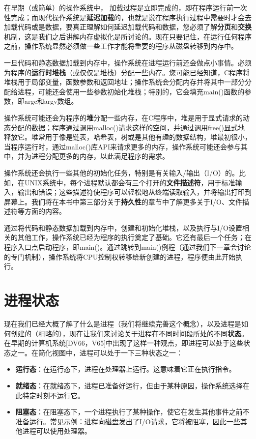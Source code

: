 在早期（或简单）的操作系统中， 加载过程是立即完成的，即在程序运行前一次性完成；而现代操作系统是\textbf{延迟加载}的，也就是说在程序执行过程中需要时才会去加载代码或是数据，要真正理解如何延迟加载代码和数据，您必须了解\textbf{分页}和\textbf{交换}机制，这是我们之后讲解内存虚拟化是所讨论的。现在只要记住，在运行任何程序之前，操作系统显然必须做一些工作才能将重要的程序从磁盘转移到内存中。

一旦代码和静态数据加载到内存中，操作系统在进程运行前还会做点小事情。必须为程序的\textbf{运行时堆栈}（或仅仅是堆栈）分配一些内存。您可能已经知道，C程序将堆栈用于局部变量，函数参数和返回地址；操作系统会分配内存并将其中一部分分配给进程，可能还会使用一些参数初始化堆栈；特别的，它会填充main()函数的参数，即argc和argv数组。

操作系统可能还会为程序的\textbf{堆}分配一些内存，在C程序中，堆是用于显式请求的动态分配的数据；程序通过调用malloc()请求这样的空间，并通过调用free()显式地释放它。堆常用于像是链表，哈希表，树或是其他有趣的数据结构，堆最初很小，当程序运行时，通过malloc()库API来请求更多的内存，操作系统可能还会参与其中，并为进程分配更多的内存，以此满足程序的需求。

操作系统还会执行一些其他的初始化任务，特别是有关输入/输出（I/O）的。比如，在UNIX系统中，每个进程默认都会有三个打开的\textbf{文件描述符}，用于标准输入，输出和错误；这些描述符使程序可以轻松地从终端读取输入，并将输出打印到屏幕上。我们将在本书中第三部分关于\textbf{持久性}的章节中了解更多关于I/O、文件描述符等方面的内容。

通过将代码和静态数据加载到内存中，创建和初始化堆栈，以及执行与I/O设置相关的其他工作，操作系统已经为程序的执行奠定了基础。它还有最后一个任务；在程序入口点启动程序，即main()。通过跳转到main()例程（通过我们下一章会讨论的专门机制），操作系统将CPU控制权转移给新创建的进程，程序便由此开始执行。

\section{进程状态}
现在我们已经大概了解了什么是进程（我们将继续完善这个概念），以及进程是如何创建的（粗略的），现在让我们来讨论关于进程在不同时间段所处的不同\textbf{状态}。在早期的计算机系统[DV66，V65]中出现了这样一种观点，即进程可以处于这些状态之一。在简化视图中，进程可以处于一下三种状态之一：
\begin{itemize}
\item \textbf{运行态}：在运行态下，进程在处理器上运行。这意味着它正在执行指令。
\item \textbf{就绪态}：在就绪态下，进程已准备好运行，但由于某种原因，操作系统选择在此特定时刻不运行它。
\item \textbf{阻塞态}：在阻塞态下，一个进程执行了某种操作，使它在发生其他事件之前不准备运行。常见示例：进程向磁盘发出了I/O请求，它将被阻塞，因此一些其他进程可以使用处理器。
\end{itemize} 


